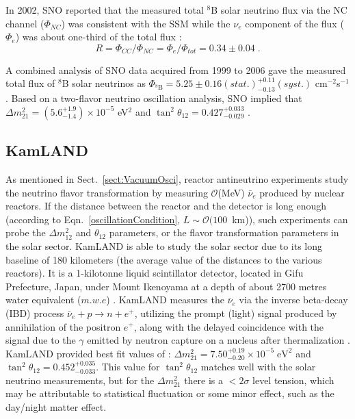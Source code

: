 In 2002, SNO reported that the measured total $^8$B solar neutrino flux via the NC channel ($\Phi_{NC}$) was consistent with the SSM while the $\nu_e$
component of the flux ($\Phi_e$) was about one-third of the total flux \cite{ahmad2002direct}:
\begin{equation}
R = \Phi_{CC}/\Phi_{NC} = \Phi_e/\Phi_{tot}=0.34\pm 0.04 \; .
\end{equation}

A combined analysis of SNO data acquired from 1999 to 2006 gave the measured total flux of $^8$B solar neutrinos as $\Phi_{^8\mathrm{B}}=5.25\pm0.16(stat.)^{+0.11}_{-0.13}(syst.)$ cm$^{-2}$s$^{-1}$. Based on a two-flavor neutrino oscillation analysis, SNO implied that $\Delta m^2_{21}=(5.6^{+1.9}_{-1.4})\times 10^{-5}$ eV$^2$ and $\tan^2\theta_{12}=0.427^{+0.033}_{-0.029}$ \cite{aharmim2013combined}.

\subsection{KamLAND}

As mentioned in Sect.~\ref{sect:VacuumOsci}, reactor antineutrino experiments study the neutrino flavor transformation by measuring $\mathcal{O}$(MeV) $\bar{\nu}_e$ produced by nuclear reactors. If the distance between the reactor and the detector is long enough (according to Eqn.~\ref{oscillationCondition}, $L\sim\mathcal{O}(100$~km)), such experiments can probe the $\Delta m^2_{12}$ and $\theta_{12}$ parameters, or the flavor transformation parameters in the solar sector. KamLAND is able to study the solar sector due to its long baseline of 180 kilometers (the average value of the distances to the various reactors). It is a 1-kilotonne liquid scintillator detector, located in Gifu Prefecture, Japan, under Mount Ikenoyama at a depth of about 2700 metres water equivalent ($m.w.e$) \cite{abe2008precision}. KamLAND measures the $\bar{\nu}_e$ via the inverse beta-decay (IBD) process $\bar{\nu}_e + p \rightarrow n + e^+$, utilizing the prompt (light) signal produced by annihilation of the positron $e^+$, along with the delayed
coincidence with the signal due to the $\gamma$ emitted by neutron capture on a nucleus after thermalization \cite{pdg2020}. KamLAND provided best fit values of \cite{gando2011constraints}: $\Delta m_{21}^2=7.50^{+0.19}_{-0.20}\times10^{-5} \; \mathrm{eV^2}$ and $\tan^2\theta_{12}=0.452^{+0.035}_{-0.033}$. This value for $\tan^2\theta_{12}$ matches well with the solar neutrino measurements, but for the $\Delta m^2_{21}$ there is a $<2\sigma$ level tension, which may be attributable to statistical fluctuation or some minor effect, such as the day/night matter effect.


